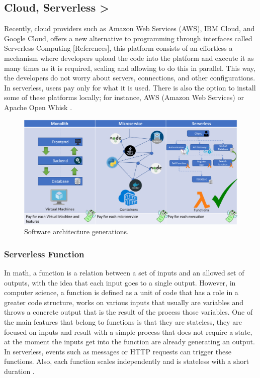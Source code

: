 \documentclass[runningheads]{llncs}
\begin{document}
\subsection{Cloud, Serverless >}


Recently, cloud providers such as Amazon Web Services (AWS), IBM Cloud, and
Google Cloud, offers a new alternative to programming through interfaces called
Serverless Computing [References], this platform consists of an effortless a
mechanism where developers upload the code into the platform and execute it as
many times as it is required, scaling and allowing to do this in parallel. This
way, the developers do not worry about servers, connections, and other
configurations. In serverless, users pay only for what it is used. There is also
the option to install some of these platforms locally; for instance, AWS (Amazon
Web Services) \cite{Baird2016} or Apache Open Whisk \cite{Guerv2018}. 


\begin{figure}[htp]
  \includegraphics[width=\textwidth]{img/architectures.png}
  \caption{Software architecture generations.} \label{fig1}
  \end{figure}

\subsubsection{Serverless Function} 
In math, a function is a relation between a set of inputs and an allowed set of
outputs, with the idea that each input goes to a single output. However, in
computer science, a function is defined as a unit of code that has a role in a
greater code structure, works on various inputs that usually are variables and
throws a concrete output that is the result of the process those variables. One
of the main features that belong to functions is that they are stateless, they
are focused on inputs and result with a simple process that does not require a
state, at the moment the inputs get into the function are already generating an
output. In serverless, events such as messages or HTTP requests can trigger
these functions. Also, each function scales independently and is stateless with
a short duration \cite{Baird2016,Cook2017}.
\end{document}
